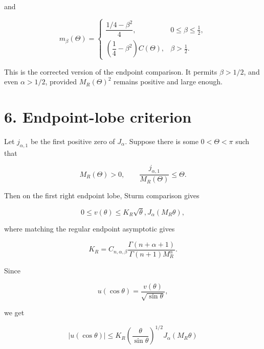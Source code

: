 \documentclass[11pt]{article}
\begin{document}
and

\begin{equation*}
m_\beta(\Theta)=
\begin{cases}
\dfrac{1/4-\beta^2}{4},
&0\le\beta\le\frac12,\\[1.2ex]
\left(\dfrac14-\beta^2\right)C(\Theta),
&\beta>\frac12.
\end{cases}
\tag{18}
\end{equation*}


This is the corrected version of the endpoint comparison. It permits \(\beta>1/2\), and even \(\alpha>1/2\), provided \(M_R(\Theta)^2\) remains positive and large enough.



\section*{6. Endpoint-lobe criterion}

Let \(j_{\alpha,1}\) be the first positive zero of \(J_\alpha\). Suppose there is some \(0<\Theta<\pi\) such that

\begin{equation*}
\boxed{
M_R(\Theta)>0,
\qquad
\frac{j_{\alpha,1}}{M_R(\Theta)}\le \Theta.
}
\tag{19}
\end{equation*}


Then on the first right endpoint lobe, Sturm comparison gives

\begin{equation*}
0\le v(\theta)
\le
K_R\sqrt{\theta},J_\alpha(M_R\theta),
\tag{20}
\end{equation*}


where matching the regular endpoint asymptotic gives

\begin{equation*}
\boxed{
K_R
=
C_{n,\alpha,\beta}
\frac{\Gamma(n+\alpha+1)}
{\Gamma(n+1)M_R^\alpha}.
}
\tag{21}
\end{equation*}


Since

\begin{equation*}
u(\cos\theta)=\frac{v(\theta)}{\sqrt{\sin\theta}},
\end{equation*}


we get

\begin{equation*}
\boxed{
|u(\cos\theta)|
\le
K_R
\left(\frac{\theta}{\sin\theta}\right)^{1/2}
J_\alpha(M_R\theta)
}
\tag{22}
\end{equation*}
\end{document}
